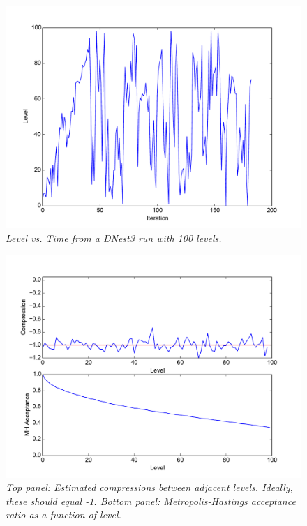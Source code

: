 \documentclass[a4paper, 11pt]{article}
\begin{document}
\begin{figure}
\begin{center}
\includegraphics[scale=0.5]{fig1.pdf}
\caption{\it Level vs. Time from a DNest3 run with 100 levels.\label{fig:fig1}}
\end{center}
\end{figure}

\begin{figure}
\begin{center}
\includegraphics[scale=0.5]{fig2.pdf}
\caption{\it Top panel: Estimated compressions between adjacent levels. Ideally, these should equal -1. Bottom panel: Metropolis-Hastings acceptance ratio
as a function of level.\label{fig:fig2}}
\end{center}
\end{figure}
\end{document}
